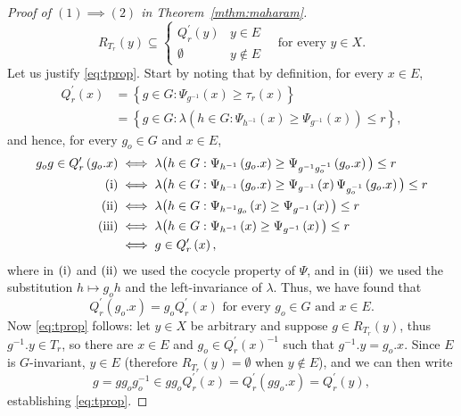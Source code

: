 \documentclass{amsart}
\numberwithin{equation}{subsection}
\begin{document}
\begin{proof}[Proof of \(\left(1\right)\implies\left(2\right)\) in Theorem~\ref{mthm:maharam}]
\begin{equation}
\label{eq:tprop}
R_{T_{r}}\left(y\right)\subseteq\begin{cases}
Q_{r}^{\prime}\left(y\right) & y\in E\\
\emptyset & y\notin E
\end{cases}\quad\text{for every }y\in X.
\end{equation}
Let us justify \eqref{eq:tprop}. Start by noting that by definition, for every \(x\in E\),
\begin{align*}
Q_{r}^{\prime}\left(x\right)
&=\left\{ g\in G:\Psi_{g^{-1}}\left(x\right)\geq\tau_{r}\left(x\right)\right\}\\
&=\left\{ g\in G:\lambda\left(h\in G:\Psi_{h^{-1}}\left(x\right)\geq\Psi_{g^{-1}}\left(x\right)\right)\leq r\right\},
\end{align*}
and hence, for every \(g_{o}\in G\) and \(x\in E\),
\begin{align*}
g_{o}g\in Q_{r}^{\prime}\left(g_{o}.x\right)
&\iff\lambda\big(h\in G:\Psi_{h^{-1}}\left(g_{o}.x\right)\geq\Psi_{g^{-1}g_{o}^{-1}}\left(g_{o}.x\right)\big)\leq r\\
\small(\mathrm{i}\small)&\iff\lambda\big(h\in G:\Psi_{h^{-1}}\left(g_{o}.x\right)\geq\Psi_{g^{-1}}\left(x\right)\Psi_{g_{o}^{-1}}\left(g_{o}.x\right)\big)\leq r\\
\small(\mathrm{ii}\small)&\iff\lambda\big(h\in G:\Psi_{h^{-1}g_{o}}\left(x\right)\geq\Psi_{g^{-1}}\left(x\right)\big)\leq r\\
\small(\mathrm{iii}\small)&\iff\lambda\big(h\in G:\Psi_{h^{-1}}\left(x\right)\geq\Psi_{g^{-1}}\left(x\right)\big)\leq r\\
&\iff g\in Q_{r}^{\prime}\left(x\right),
\end{align*}
where in \(\small(\mathrm{i}\small)\) and \(\small(\mathrm{ii}\small)\) we used the cocycle property of \(\Psi\), and in \(\small(\mathrm{iii}\small)\) we used the substitution \(h\mapsto g_{o}h\) and the left-invariance of \(\lambda\). Thus, we have found that
\[Q_{r}^{\prime}\left(g_{o}.x\right)=g_{o}Q_{r}^{\prime}\left(x\right)\text{ for every }g_{o}\in G\text{ and }x\in E.\]
Now \eqref{eq:tprop} follows: let \(y\in X\) be arbitrary and suppose \(g\in R_{T_{r}}\left(y\right)\), thus \(g^{-1}.y\in T_{r}\), so there are \(x\in E\) and \(g_{o}\in Q_{r}^{\prime}\left(x\right)^{-1}\) such that \(g^{-1}.y=g_{o}.x\). Since \(E\) is \(G\)-invariant, \(y\in E\) (therefore \(R_{T_{r}}\left(y\right)=\emptyset\) when \(y\notin E\)), and we can then write
\[g=gg_{o}g_{o}^{-1}\in gg_{o}Q_{r}^{\prime}\left(x\right)=Q_{r}^{\prime}\left(gg_{o}.x\right)=Q_{r}^{\prime}\left(y\right),\]
establishing \eqref{eq:tprop}.


\end{proof}
\end{document}
